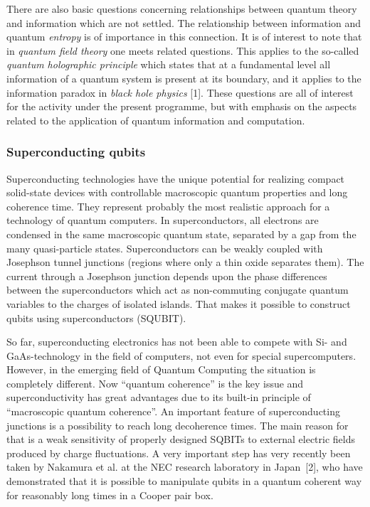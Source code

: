There are also basic questions concerning relationships
between quantum theory and information which are not settled. The
relationship between information and quantum {\em entropy} is of
importance in this connection. It is of interest to note that in {\em
quantum field theory} one meets related questions. This applies to the
so-called {\em quantum holographic principle} which states that at a
fundamental level all information of a quantum system is present at its
boundary, and it applies to the information paradox in {\em black hole
physics} [1]. These questions are all of interest for the
activity under the present programme, but with emphasis on the aspects
related to the application of quantum information and computation.

\subsubsection{Superconducting qubits}

Superconducting technologies have the unique potential for realizing
compact solid-state devices with  controllable macroscopic quantum
properties and long coherence time. They represent probably the most
realistic approach for a technology of quantum computers. In
superconductors, all electrons are condensed in  the same macroscopic
quantum state, separated by a gap from the many quasi-particle states.
Superconductors can be weakly coupled with Josephson tunnel junctions
(regions where only a thin oxide  separates them). The current through
a Josephson junction depends upon the phase differences between the
superconductors which act as non-commuting conjugate quantum variables
to the charges of isolated islands.  That makes it possible to construct
qubits using superconductors (SQUBIT).

So far, superconducting electronics has not been able to compete
with Si- and GaAs-technology in the  field of computers, not even for
special supercomputers. However, in the emerging field of Quantum
Computing the situation is completely different. Now ``quantum
coherence'' is the key issue and  superconductivity has great
advantages due to its built-in principle of ``macroscopic quantum
coherence''. An  important feature of superconducting junctions is a
possibility to reach long decoherence times. The main  reason for that
is a weak sensitivity of properly designed SQBITs to external electric
fields produced by charge fluctuations. A very important step has very
recently been taken by Nakamura et al. at the NEC  research laboratory
in Japan~[2],  who have demonstrated that it is
possible to manipulate qubits in a quantum coherent way for reasonably
long times in a Cooper pair
box.

